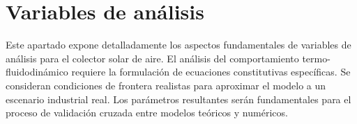 \section{Variables de análisis}
\label{sec:cap07_variables}

Este apartado expone detalladamente los aspectos fundamentales de variables de análisis para el colector solar de aire.
El análisis del comportamiento termo-fluidodinámico requiere la formulación de ecuaciones constitutivas específicas.
Se consideran condiciones de frontera realistas para aproximar el modelo a un escenario industrial real.
Los parámetros resultantes serán fundamentales para el proceso de validación cruzada entre modelos teóricos y numéricos.
